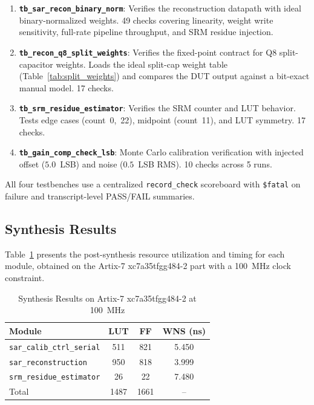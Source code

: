 \documentclass[journal]{IEEEtran}
\begin{document}
\begin{enumerate}
    \item \textbf{\texttt{tb\_sar\_recon\_binary\_norm}}: Verifies the
          reconstruction datapath with ideal binary-normalized weights. 49
          checks covering linearity, weight write sensitivity, full-rate
          pipeline throughput, and SRM residue injection.
    \item \textbf{\texttt{tb\_recon\_q8\_split\_weights}}: Verifies the
          fixed-point contract for Q8 split-capacitor weights. Loads the
          ideal split-cap weight table (Table~\ref{tab:split_weights}) and
          compares the DUT output against a bit-exact manual model. 17 checks.
    \item \textbf{\texttt{tb\_srm\_residue\_estimator}}: Verifies the SRM
          counter and LUT behavior. Tests edge cases (count~0,~22), midpoint
          (count~11), and LUT symmetry. 17 checks.
    \item \textbf{\texttt{tb\_gain\_comp\_check\_lsb}}: Monte Carlo
          calibration verification with injected offset ($5.0$~LSB) and
          noise ($0.5$~LSB RMS). 10 checks across 5 runs.
\end{enumerate}

All four testbenches use a centralized \texttt{record\_check} scoreboard
with \texttt{\$fatal} on failure and transcript-level PASS/FAIL summaries.

\subsection{Synthesis Results}

Table~\ref{tab:synthesis} presents the post-synthesis resource utilization
and timing for each module, obtained on the Artix-7 xc7a35tfgg484-2 part with
a 100~MHz clock constraint.

\begin{table}[!t]
\centering
\caption{Synthesis Results on Artix-7 xc7a35tfgg484-2 at 100~MHz}
\label{tab:synthesis}
\begin{tabular}{lccc}
\toprule
Module & LUT & FF & WNS (ns) \\
\midrule
\texttt{sar\_calib\_ctrl\_serial} & 511 & 821 & 5.450 \\
\texttt{sar\_reconstruction} & 950 & 818 & 3.999 \\
\texttt{srm\_residue\_estimator} & 26 & 22 & 7.480 \\
\midrule
Total & 1487 & 1661 & -- \\
\bottomrule
\end{tabular}
\end{table}
\end{document}

